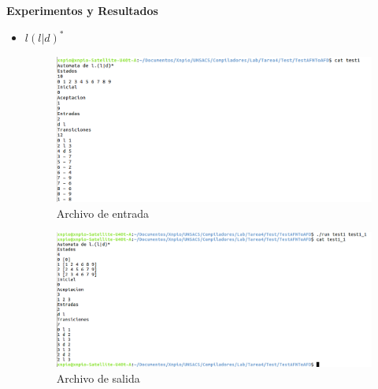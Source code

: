 \documentclass[a4paper,12pt]{article}
\begin{document}
 
\begin{large}
 \textbf{Experimentos y Resultados}
\end{large}

\begin{itemize}
 \item $l(l|d)^{*}$
 \begin{figure}[H]
  \centering
  \includegraphics[scale = 0.4]{1.png}
  \caption{Archivo de entrada}
 \end{figure}
 \begin{figure}[H]
  \centering
  \includegraphics[scale = 0.4]{2.png}
  \caption{Archivo de salida}
 \end{figure}


\end{itemize}
\end{document}
